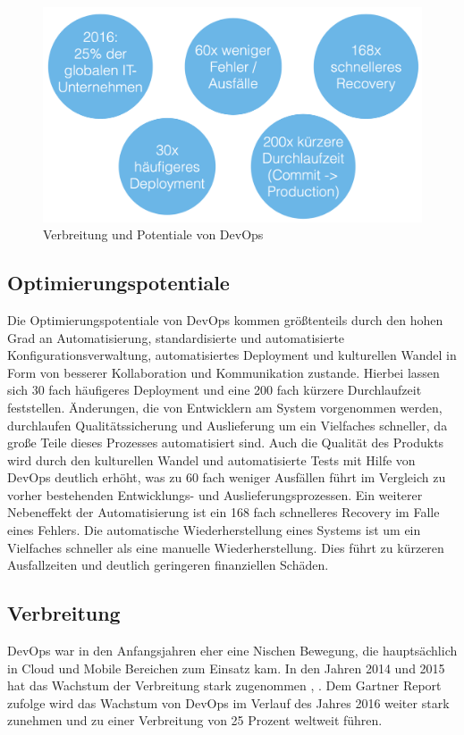 \begin{figure}[ht]
  \centering
  \includegraphics[width=\textwidth]{img/devops_zahlen.png}
  \caption{Verbreitung und Potentiale von DevOps}
  \label{fig:scrummodell}
\end{figure}

\subsection{Optimierungspotentiale}
Die Optimierungspotentiale von DevOps kommen größtenteils durch den hohen Grad an Automatisierung, standardisierte und automatisierte Konfigurationsverwaltung, automatisiertes Deployment und kulturellen Wandel in Form von besserer Kollaboration und Kommunikation zustande. Hierbei lassen sich 30 fach häufigeres Deployment und eine 200 fach kürzere Durchlaufzeit feststellen. Änderungen, die von Entwicklern am System vorgenommen werden, durchlaufen Qualitätssicherung und Auslieferung um ein Vielfaches schneller, da große Teile dieses Prozesses automatisiert sind. Auch die Qualität des Produkts wird durch den kulturellen Wandel und automatisierte Tests mit Hilfe von DevOps deutlich erhöht, was zu 60 fach weniger Ausfällen führt im Vergleich zu vorher bestehenden Entwicklungs- und Auslieferungsprozessen. Ein weiterer Nebeneffekt der Automatisierung ist ein 168 fach schnelleres Recovery im Falle eines Fehlers. Die automatische Wiederherstellung eines Systems ist um ein Vielfaches schneller als eine manuelle Wiederherstellung. Dies führt zu kürzeren Ausfallzeiten und deutlich geringeren finanziellen Schäden. \parencite[Vgl.][]{DevOpsSODR:2015}

\subsection{Verbreitung}
DevOps war in den Anfangsjahren eher eine Nischen Bewegung, die hauptsächlich in Cloud und Mobile Bereichen zum Einsatz kam. In den Jahren 2014 und 2015 hat das Wachstum der Verbreitung stark zugenommen \parencite[Vgl.][]{DevOpsSODR:2014}, \parencite[Vgl.][]{DevOpsSODR:2015}. Dem Gartner Report \parencite[Vgl.][]{Gartner:2015} zufolge wird das Wachstum von DevOps im Verlauf des Jahres 2016 weiter stark zunehmen und zu einer Verbreitung von 25 Prozent weltweit führen.

